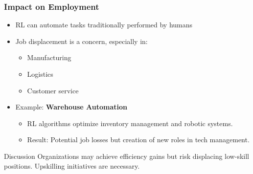\documentclass[aspectratio=169]{beamer}
\begin{document}
\begin{frame}[fragile]
    \frametitle{Impact on Employment}
    \begin{itemize}
        \item RL can automate tasks traditionally performed by humans
        \item Job displacement is a concern, especially in:
        \begin{itemize}
            \item Manufacturing
            \item Logistics
            \item Customer service
        \end{itemize}
        \item Example: \textbf{Warehouse Automation}
        \begin{itemize}
            \item RL algorithms optimize inventory management and robotic systems.
            \item Result: Potential job losses but creation of new roles in tech management.
        \end{itemize}
    \end{itemize}
    \begin{block}{Discussion}
        Organizations may achieve efficiency gains but risk displacing low-skill positions. Upskilling initiatives are necessary.
    \end{block}
\end{frame}
\end{document}
